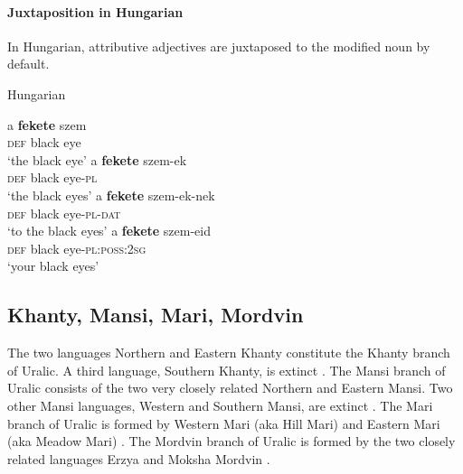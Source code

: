\paragraph*{Juxtaposition in Hungarian}
In Hungarian, attributive adjectives are juxtaposed to the modified noun by default.
\begin{exe}
\label{hung juxt}
\ex \rm{Hungarian \citep[41]{hall1938}}
\begin{xlist}
\ex 
\gll	a \textbf{fekete} szem\\
	\textsc{def} black eye\\
\glt	‘the black eye’
\ex	
\gll	a \textbf{fekete} szem-ek\\
	\textsc{def} black eye-\textsc{pl}\\
\glt	‘the black eyes’
\ex
\gll	a \textbf{fekete} szem-ek-nek\\
	\textsc{def} black eye-\textsc{pl}-\textsc{dat}\\
\glt	‘to the black eyes’
\ex
\gll	a \textbf{fekete} szem-eid\\
	\textsc{def} black eye-\textsc{pl:poss:2sg}\\
\glt	‘your black eyes’
\end{xlist}
\end{exe}

\subsection{Khanty, Mansi, Mari, Mordvin}
The two languages Northern and Eastern Khanty constitute the Khanty branch of Uralic. A third language, Southern Khanty, is extinct \citep[231]{salminen2007}. The Mansi branch of Uralic consists of the two very closely related Northern and Eastern Mansi. Two other Mansi languages, Western and Southern Mansi, are extinct \citep[231]{salminen2007}. The Mari branch of Uralic is formed by Western Mari (aka Hill Mari) and Eastern Mari (aka Meadow Mari) \citep[231]{salminen2007}. The Mordvin branch of Uralic is formed by the two closely related languages Erzya and Moksha Mordvin \citep[231]{salminen2007}.

